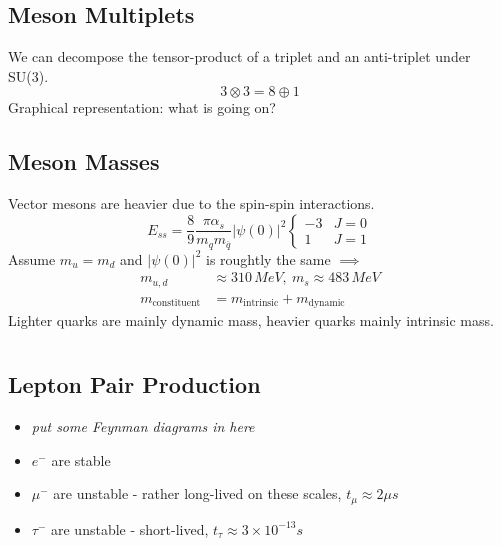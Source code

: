\documentclass[a4paper, 11pt, normalem]{report}
\begin{document}
\section{Meson Multiplets}
We can decompose the tensor-product of a triplet and an anti-triplet under SU(3).
\begin{equation}
    3 \otimes 3 = 8 \oplus 1
\end{equation}
Graphical representation: what is going on?

\section{Meson Masses}
Vector mesons are heavier due to the spin-spin interactions.
\begin{equation}
    E_{ss} = \frac{8}{9}\frac{\pi \alpha_s}{m_qm_{\bar{q}}}|\psi(0)|^2 \begin{cases} -3 & J = 0 \\ 1 & J = 1\end{cases}
\end{equation}
Assume $m_u = m_d$ and $|\psi(0)|^2$ is roughtly the same $\implies$
\begin{align}
    m_{u,d} &\approx 310\,MeV,~ m_s \approx 483\,MeV \\
    m_{\text{constituent}} &= m_{\text{intrinsic}} + m_{\text{dynamic}}
\end{align}
Lighter quarks are mainly dynamic mass, heavier quarks mainly intrinsic mass.

\chapter{}

\chapter{}
\section{Lepton Pair Production}
\begin{itemize}
    \item \textit{put some Feynman diagrams in here}
    \item $e^-$ are stable
    \item $\mu^-$ are unstable - rather long-lived on these scales, $t_\mu \approx 2\mu s$
    \item $\tau^-$ are unstable - short-lived, $t_\tau \approx 3\times10^{-13}s$
\end{itemize}
\end{document}
